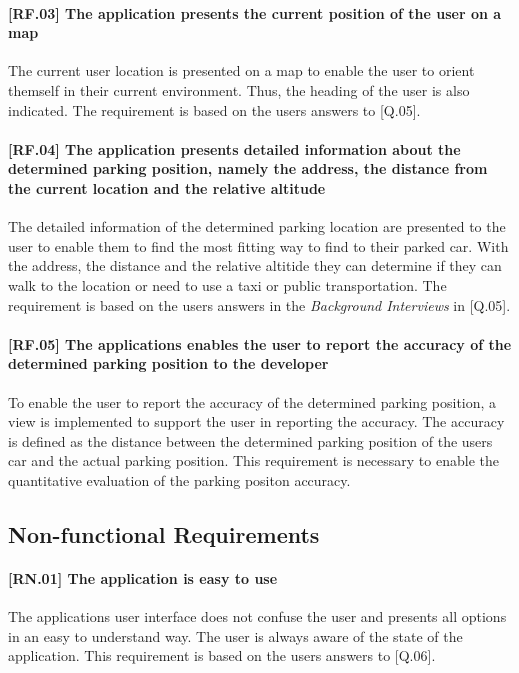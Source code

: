 \paragraph{[RF.03] The application presents the current position of the user on a map}
The current user location is presented on a map to enable the user to orient themself in their current environment. Thus, the heading of the user is also indicated. The requirement is based on the users answers to [Q.05].

\paragraph{[RF.04] The application presents detailed information about the determined parking position, namely the address, the distance from the current location and the relative altitude}
The detailed information of the determined parking location are presented to the user to enable them to find the most fitting way to find to their parked car. With the address, the distance and the relative altitide they can determine if they can walk to the location or need to use a taxi or public transportation. The requirement is based on the users answers in the \textit{Background Interviews} in [Q.05].

\paragraph{[RF.05] The applications enables the user to report the accuracy of the determined parking position to the developer}
To enable the user to report the accuracy of the determined parking position, a view is implemented to support the user in reporting the accuracy. The accuracy is defined as the distance between the determined parking position of the users car and the actual parking position. This requirement is necessary to enable the quantitative evaluation of the parking positon accuracy. 

\subsection{Non-functional Requirements}

\paragraph{[RN.01] The application is easy to use}
The applications user interface does not confuse the user and presents all options in an easy to understand way. The user is always aware of the state of the application. This requirement is based on the users answers to [Q.06].

